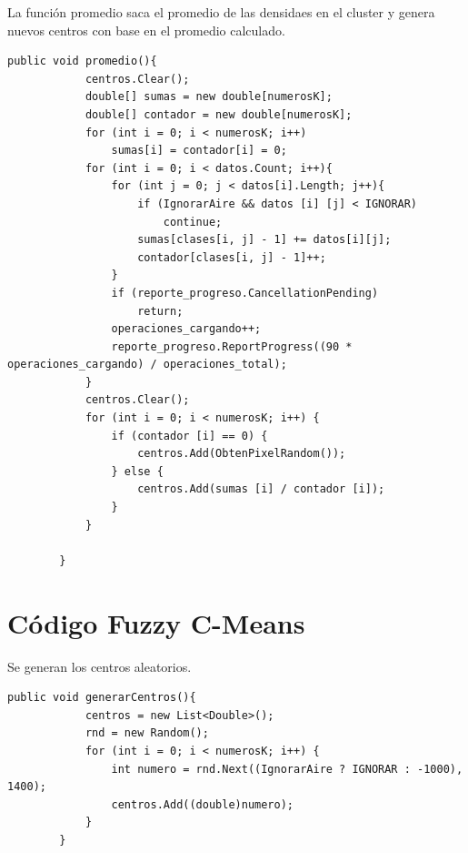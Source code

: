 \documentclass[12pt]{report}
\begin{document}
\newpage
La función promedio saca el promedio de las densidaes en el cluster y genera nuevos centros con base en el promedio calculado.
\lstset{language=C, breaklines=true, basicstyle=\footnotesize}
\lstset{numbers=left, numberstyle=\tiny, stepnumber=1, numbersep=-2pt}
\begin{lstlisting}[frame=single]
	public void promedio(){
            centros.Clear();
            double[] sumas = new double[numerosK];
            double[] contador = new double[numerosK];
            for (int i = 0; i < numerosK; i++)            
                sumas[i] = contador[i] = 0;            
            for (int i = 0; i < datos.Count; i++){
                for (int j = 0; j < datos[i].Length; j++){
                    if (IgnorarAire && datos [i] [j] < IGNORAR)
                        continue;
                    sumas[clases[i, j] - 1] += datos[i][j];
                    contador[clases[i, j] - 1]++;
                }
                if (reporte_progreso.CancellationPending)
                    return;
                operaciones_cargando++;
                reporte_progreso.ReportProgress((90 * operaciones_cargando) / operaciones_total);
            }
            centros.Clear();
            for (int i = 0; i < numerosK; i++) {
                if (contador [i] == 0) {
                    centros.Add(ObtenPixelRandom());
                } else {
                    centros.Add(sumas [i] / contador [i]);
                }
            }
            
        }
\end{lstlisting}

\chapter{Código Fuzzy C-Means}
Se generan los centros aleatorios.
\lstset{language=C, breaklines=true, basicstyle=\footnotesize}
\lstset{numbers=left, numberstyle=\tiny, stepnumber=1, numbersep=-2pt}
\begin{lstlisting}[frame=single]
	public void generarCentros(){
            centros = new List<Double>();
            rnd = new Random();
            for (int i = 0; i < numerosK; i++) {
                int numero = rnd.Next((IgnorarAire ? IGNORAR : -1000), 1400);
                centros.Add((double)numero);
            }
        }
\end{lstlisting}
\end{document}
